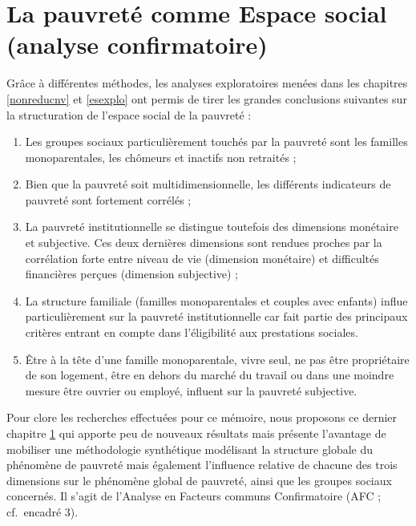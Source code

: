 \documentclass[12pt,a4paper]{reedthesis}
\begin{document}
\hypertarget{esconfi}{%
\chapter{La pauvreté comme Espace social (analyse confirmatoire)}\label{esconfi}}

Grâce à différentes méthodes, les analyses exploratoires menées dans les chapitres \ref{nonreducnv} et \ref{esexplo} ont permis de tirer les grandes conclusions suivantes sur la structuration de l'espace social de la pauvreté :
\begin{enumerate}
\def\labelenumi{\arabic{enumi}.}
\item
  Les groupes sociaux particulièrement touchés par la pauvreté sont les familles monoparentales, les chômeurs et inactifs non retraités ;
\item
  Bien que la pauvreté soit multidimensionnelle, les différents indicateurs de pauvreté sont fortement corrélés ;
\item
  La pauvreté institutionnelle se distingue toutefois des dimensions monétaire et subjective. Ces deux dernières dimensions sont rendues proches par la corrélation forte entre niveau de vie (dimension monétaire) et difficultés financières perçues (dimension subjective) ;
\item
  La structure familiale (familles monoparentales et couples avec enfants) influe particulièrement sur la pauvreté institutionnelle car fait partie des principaux critères entrant en compte dans l'éligibilité aux prestations sociales.
\item
  Être à la tête d'une famille monoparentale, vivre seul, ne pas être propriétaire de son logement, être en dehors du marché du travail ou dans une moindre mesure être ouvrier ou employé, influent sur la pauvreté subjective.
\end{enumerate}
Pour clore les recherches effectuées pour ce mémoire, nous proposons ce dernier chapitre \ref{esconfi} qui apporte peu de nouveaux résultats mais présente l'avantage de mobiliser une méthodologie synthétique modélisant la structure globale du phénomène de pauvreté mais également l'influence relative de chacune des trois dimensions sur le phénomène global de pauvreté, ainsi que les groupes sociaux concernés. Il s'agit de l'Analyse en Facteurs communs Confirmatoire (AFC ; cf.~encadré 3).
\end{document}
